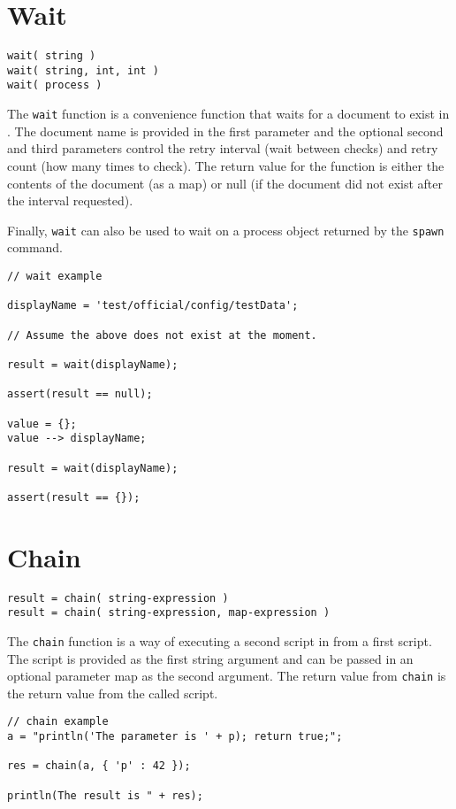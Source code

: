 \section{Wait}

\begin{Verbatim}
wait( string )
wait( string, int, int )
wait( process )
\end{Verbatim}

The \Verb+wait+ function is a convenience function that waits for a document to exist in \Rapture. The document name is provided in the first parameter and the optional second and third parameters control the retry interval (wait between checks) and retry count (how many times to check). The return value for the function is either the contents of the document (as a map) or null (if the document did not exist after the interval requested).

Finally, \Verb+wait+ can also be used to wait on a process object returned by the \verb+spawn+ command.

\begin{lstlisting}[caption={Wait example}]
// wait example

displayName = 'test/official/config/testData';

// Assume the above does not exist at the moment.

result = wait(displayName);

assert(result == null);

value = {};
value --> displayName;

result = wait(displayName);

assert(result == {});
\end{lstlisting}

\section{Chain}

\begin{Verbatim}
result = chain( string-expression )
result = chain( string-expression, map-expression )
\end{Verbatim}

The \Verb+chain+ function is a way of executing a second script in \Reflex from a first script. The script is provided as the first string argument and can be passed in an optional parameter map as the second argument. The return value from \verb+chain+ is the return value from the called script.

\begin{lstlisting}[caption={Chain example}]
// chain example
a = "println('The parameter is ' + p); return true;";

res = chain(a, { 'p' : 42 });

println(The result is " + res);

\end{lstlisting}

